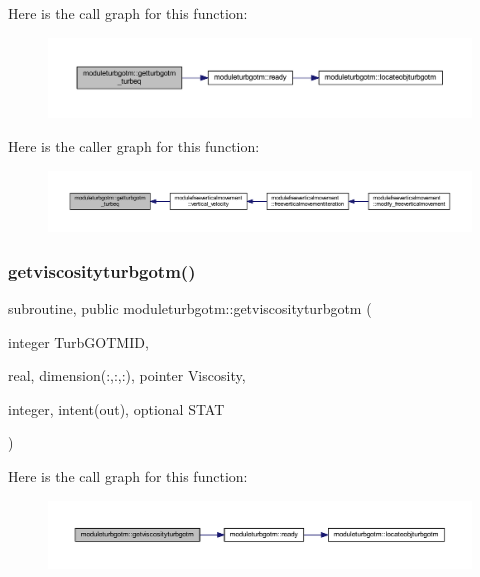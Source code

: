 Here is the call graph for this function\+:\nopagebreak
\begin{figure}[H]
\begin{center}
\leavevmode
\includegraphics[width=350pt]{namespacemoduleturbgotm_a087db16b86a3a5c9670ca783b6075e65_cgraph}
\end{center}
\end{figure}
Here is the caller graph for this function\+:\nopagebreak
\begin{figure}[H]
\begin{center}
\leavevmode
\includegraphics[width=350pt]{namespacemoduleturbgotm_a087db16b86a3a5c9670ca783b6075e65_icgraph}
\end{center}
\end{figure}
\mbox{\label{namespacemoduleturbgotm_a96d85a3644e939450eb599e84624f5b3}} 
\subsubsection{\texorpdfstring{getviscosityturbgotm()}{getviscosityturbgotm()}}
{\footnotesize\ttfamily subroutine, public moduleturbgotm\+::getviscosityturbgotm (\begin{DoxyParamCaption}\item[{integer}]{Turb\+G\+O\+T\+M\+ID,  }\item[{real, dimension(\+:,\+:,\+:), pointer}]{Viscosity,  }\item[{integer, intent(out), optional}]{S\+T\+AT }\end{DoxyParamCaption})}

Here is the call graph for this function\+:\nopagebreak
\begin{figure}[H]
\begin{center}
\leavevmode
\includegraphics[width=350pt]{namespacemoduleturbgotm_a96d85a3644e939450eb599e84624f5b3_cgraph}
\end{center}
\end{figure}
\mbox{\label{namespacemoduleturbgotm_aad945eb0d5a2d67bc28f53a95bed4242}} 
